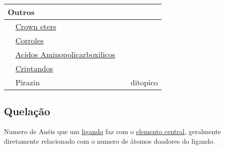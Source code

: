 \documentclass{article}
\begin{document}
{\begin{longtable}{c l c l}
	\\ \midrule
	
	\multicolumn{4}{l}{\textbf{Outros}}
	
	\\ \midrule
	
	   & \hyperref[crown eters]{Crown eters}
	\\ & \hyperref[corroles]{Corroles}
	\\ & \hyperref[acidos aminopolicarboxilicos]
			   {Acidos Aminopolicarboxilicos}
	\\ & \hyperref[criptandos]{Criptandos}
	\\ \ch{C4H4N2} & Pirazin & \ch{=} & ditopico
	
\end{longtable}
}

\subsection{Quelação}
\label{quelacao}
%
Numero de Anéis que um \hyperref[ligando]{ligando} faz com o \hyperref[elemento central]{elemento central}, geralmente diretamente relacionado com o numero de átomos doadores do ligando.
%

\setlength{\tabcolsep}{4mm}
\end{document}
